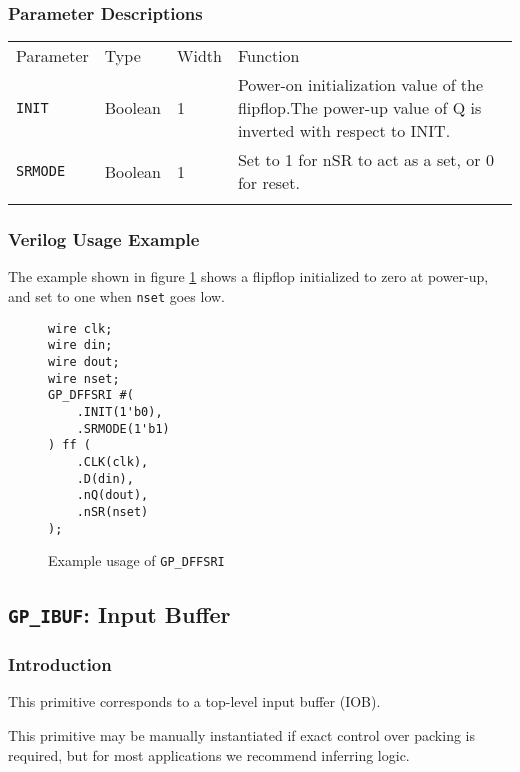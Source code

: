\documentclass[11pt]{article}
\newcommand{\tokenstyle}[1]{\texttt{#1}}
\newcommand{\wirestyle}[1]{\texttt{#1}}
\newcommand{\whenstyle}[1]{{\fontseries{sb}\selectfont#1}}
\newcommand{\thinhline}{\Xhline{1\arrayrulewidth}}
\newcommand{\thickhline}{\Xhline{2.5\arrayrulewidth}}
\begin{document}
\subsubsection{Parameter Descriptions}

\begin{tabularx}{\textwidth}{lllX}
\thinhline
\whenstyle{Parameter} & \whenstyle{Type} & \whenstyle{Width} & \whenstyle{Function} \\
\thickhline
\tokenstyle{INIT} & Boolean & 1 & Power-on initialization value of the flipflop.\newline The power-up value of Q is 
inverted with respect to INIT.\\
\thinhline
\tokenstyle{SRMODE} & Boolean & 1 & Set to 1 for nSR to act as a set, or 0 for reset. \\
\thinhline
\end{tabularx}

\subsubsection{Verilog Usage Example}

The example shown in figure \ref{gp-dffsri-example} shows a flipflop initialized to zero at power-up, and set to one
when \wirestyle{nset} goes low.

\begin{figure}[h]
\begin{lstlisting}
wire clk;
wire din;
wire dout;
wire nset;
GP_DFFSRI #(
	.INIT(1'b0),
	.SRMODE(1'b1)
) ff (
	.CLK(clk),
	.D(din),
	.nQ(dout),
	.nSR(nset)
);
\end{lstlisting}
\caption{Example usage of \tokenstyle{GP\_DFFSRI}}
\label{gp-dffsri-example}
\end{figure}


\pagebreak
\subsection{\tokenstyle{GP\_IBUF}: Input Buffer}
\label{gp-ibuf}

\subsubsection{Introduction}
This primitive corresponds to a top-level input buffer (IOB).

This primitive may be manually instantiated if exact control over packing is required, but for most applications we
recommend inferring logic.
\end{document}
